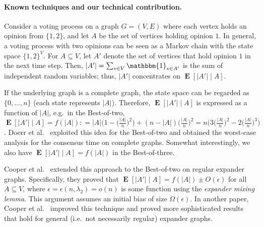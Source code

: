 \documentclass[letterpaper,11pt]{article}
\DeclareMathOperator{\E}{\mathbf{E}}
\def\defeq{\mathrel{\mathop:}=}%
\begin{document}
\paragraph*{Known techniques and our technical contribution.}
Consider a voting process on a graph $G=(V,E)$ where each vertex holds an opinion from $\{1,2\}$, 
and let $A$ be the set of vertices holding opinion $1$.
In general, a voting process with two opinions can be seen as a Markov chain with the state space $\{1,2\}^V$.
For $A\subseteq V$, let $A'$ denote the set of vertices that hold opinion $1$ in the next time step.
Then, $|A'|=\sum_{v\in V}\mathbbm{1}_{v\in A'}$ is the sum of independent random variables; thus, $|A'|$ concentrates on $\E[|A'|\mid A]$.

If the underlying graph is a complete graph, the state space can be regarded as $\{0,\ldots,n \}$ (each state represents $|A|$).
Therefore, $\E[|A'| \mid A]$ is expressed as a function of $|A|$, e.g.~in the Best-of-two, 
$\E[|A'| \mid A]=f(|A|)\defeq |A|\bigl(1-\bigl(\frac{|A|}{n}\bigr)^2\bigr)+(n-|A|)\bigl(\frac{|A|}{n}\bigr)^2=n\bigl(3\bigl(\frac{|A|}{n}\bigr)^2-2\bigl(\frac{|A|}{n}\bigr)^3\bigr)$.
Doerr et al.~\cite{DGMSS11} exploited this idea for the Best-of-two and obtained the worst-case analysis for the consensus time on complete graphs.
Somewhat interestingly, we also have $\E[|A'| \mid A]=f(|A|)$ in the Best-of-three. %

Cooper et al.~\cite{CER14} extended this approach to the Best-of-two on regular expander graphs.
Specifically, they proved that $\E[|A'|\mid A]=f(|A|)\pm O(\epsilon)$ for all $A\subseteq V$, where $\epsilon=\epsilon(n,\lambda_2)=o(n)$ is some function using the \emph{expander mixing lemma}.
This argument  assumes an initial bias of size $\Omega(\epsilon)$.
In another paper, Cooper et al.~\cite{CERRS15} improved this technique and proved more sophisticated results that hold for general (i.e.~not necessarily regular) expander graphs.
\end{document}

